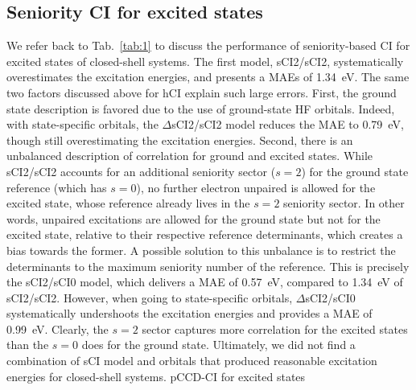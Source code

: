 \documentclass[aip,jcp,reprint,noshowkeys,superscriptaddress]{revtex4-1}
\begin{document}
\subsection{Seniority CI for excited states}
\label{sec:res_C}


We refer back to Tab.~\ref{tab:1} to discuss the performance of seniority-based CI for excited states of closed-shell systems.
The first model, sCI2/sCI2, systematically overestimates the excitation energies, and presents a MAEs of \SI{1.34}{\eV}.
The same two factors discussed above for hCI explain such large errors.
First, the ground state description is favored due to the use of ground-state HF orbitals.
Indeed, with state-specific orbitals, the $\Delta$sCI2/sCI2 model reduces the MAE to \SI{0.79}{\eV}, though still overestimating the excitation energies.
Second, there is an unbalanced description of correlation for ground and excited states.
While sCI2/sCI2 accounts for an additional seniority sector ($s=2$) for the ground state reference (which has $s=0$), 
no further electron unpaired is allowed for the excited state, whose reference already lives in the $s=2$ seniority sector.
In other words, unpaired excitations are allowed for the ground state but not for the excited state, relative to their respective reference determinants, which creates a bias towards the former.
A possible solution to this unbalance is to restrict the determinants to the maximum seniority number of the reference.
This is precisely the sCI2/sCI0 model, which delivers a MAE of \SI{0.57}{\eV}, compared to \SI{1.34}{\eV} of sCI2/sCI2.
However, when going to state-specific orbitals, $\Delta$sCI2/sCI0 systematically undershoots the excitation energies and provides a MAE of \SI{0.99}{\eV}.
Clearly, the $s=2$ sector captures more correlation for the excited states than the $s=0$ does for the ground state.
Ultimately, we did not find a combination of sCI model and orbitals that produced reasonable excitation energies for closed-shell systems.
pCCD-CI for excited states \cite{Nowak_2023}
\end{document}

